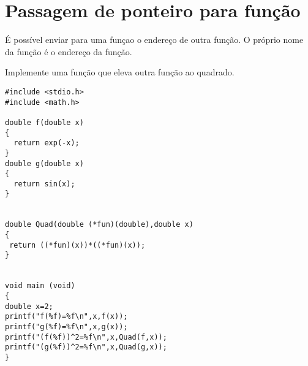 \section{Passagem de ponteiro para função}
É possível enviar para uma funçao o endereço de outra função. O próprio nome da função é o endereço da função.
\begin{ex}
Implemente uma função que eleva outra função ao quadrado.
\end{ex}
\begin{verbatim}
#include <stdio.h>
#include <math.h>

double f(double x)
{
  return exp(-x);
}
double g(double x)
{
  return sin(x);
}


double Quad(double (*fun)(double),double x)
{
 return ((*fun)(x))*((*fun)(x));
}


void main (void)
{
double x=2;
printf("f(%f)=%f\n",x,f(x));
printf("g(%f)=%f\n",x,g(x));
printf("(f(%f))^2=%f\n",x,Quad(f,x));
printf("(g(%f))^2=%f\n",x,Quad(g,x));
}
\end{verbatim}

